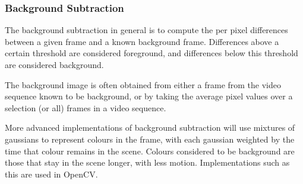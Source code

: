 \subsubsection{Background Subtraction}

The background subtraction in general is to compute the per pixel differences between a given frame and a known background frame. Differences above a certain threshold are considered foreground, and differences below this threshold are considered background.

The background image is often obtained from either a frame from the video sequence known to be background, or by taking the average pixel values over a selection (or all) frames in a video sequence.

More advanced implementations of background subtraction will use mixtures of gaussians to represent colours in the frame, with each gaussian weighted by the time that colour remains in the scene\cite{backgroundsubmog}. Colours considered to be background are those that stay in the scene longer, with less motion. Implementations such as this are used in OpenCV\cite{opencv}.